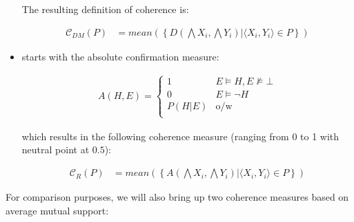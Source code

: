 \documentclass[10pt,]{scrartcl}
\begin{document}
\begin{itemize}
The resulting definition of coherence is:

\begin{align}
\tag{DM}  
    \mathcal{C}_{DM}(P) & =
mean\left(\left\{D(\bigwedge X_i, \bigwedge Y_i) | \langle X_i, Y_i\rangle \in P\right\} \right)
\end{align}





\item  \citet{Roche2013Coherence} starts with the
absolute confirmation measure:

\begin{align*}
    A(H,E) = \begin{cases}
    1 & E\models H, E\not \models \bot \\
    0 & E \models \neg H\\
    P(H|E) & \mbox{o/w} \\
    \end{cases}
\end{align*}

which results in the following coherence measure (ranging from 0 to 1 with neutral point at $0.5$):

\begin{align}
\tag{Roche}  
    \mathcal{C}_{R}(P) & =
mean\left(\left\{A(\bigwedge X_i, \bigwedge Y_i) | \langle X_i, Y_i\rangle \in P\right\} \right) 
\end{align}



\end{itemize}


For comparison purposes, we will also bring up two coherence measures  based on average mutual support:
\end{document}
